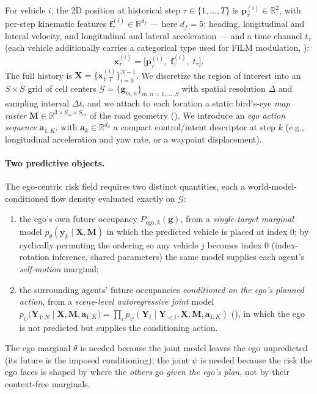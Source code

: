 \documentclass[journal]{IEEEtran}
\begin{document}
For vehicle $i$, the 2D position at historical step $\tau\in\{1,\dots,T\}$ is $\mathbf{p}^{(i)}_{\tau}\in\mathbb{R}^2$, with per-step kinematic features $\mathbf{f}^{(i)}_{\tau}\in\mathbb{R}^{d_f}$ --- here $d_f{=}5$: heading, longitudinal and lateral velocity, and longitudinal and lateral acceleration --- and a time channel $t_{\tau}$ (each vehicle additionally carries a categorical type used for FiLM modulation, ):
\begin{equation}
\mathbf{x}^{(i)}_{\tau}=\big[\mathbf{p}^{(i)}_{\tau},\;\mathbf{f}^{(i)}_{\tau},\;t_{\tau}\big].
\label{eq:input_def}
\end{equation}
The full history is $\mathbf{X}=\{\mathbf{x}^{(i)}_{1:T}\}_{i=0}^{N-1}$. We discretize the region of interest into an $S\times S$ grid of cell centers $\mathcal{G}=\{\mathbf{g}_{m,n}\}_{m,n=1,\dots,S}$ with spatial resolution $\Delta$ and sampling interval $\Delta t$, and we attach to each location a static bird's-eye \emph{map raster} $\mathbf{M}\in\mathbb{R}^{3\times S_m\times S_m}$ of the road geometry (). We introduce an \emph{ego action sequence} $\mathbf{a}_{1:K}$, with $\mathbf{a}_k\in\mathbb{R}^{d_a}$ a compact control/intent descriptor at step $k$ (e.g., longitudinal acceleration and yaw rate, or a waypoint displacement).

\paragraph{Two predictive objects.} The ego-centric risk field requires two distinct quantities, each a world-model-conditioned flow density evaluated exactly on $\mathcal{G}$:
\begin{enumerate}
\item the ego's own future occupancy $P_{\mathrm{ego},k}(\mathbf{g})$, from a \emph{single-target marginal} model $p_{\theta}(\mathbf{y}_k\mid\mathbf{X},\mathbf{M})$ in which the predicted vehicle is placed at index $0$; by cyclically permuting the ordering so any vehicle $j$ becomes index $0$ (index-rotation inference, shared parameters) the same model supplies each agent's \emph{self-motion} marginal;
\item the surrounding agents' future occupancies \emph{conditioned on the ego's planned action}, from a \emph{scene-level autoregressive joint} model $p_{\psi}\!\big(\mathbf{Y}_{1:N}\mid\mathbf{X},\mathbf{M},\mathbf{a}_{1:K}\big)=\prod_i p_{\psi}(\mathbf{Y}_i\mid\mathbf{Y}_{<i},\mathbf{X},\mathbf{M},\mathbf{a}_{1:K})$ (), in which the ego is not predicted but supplies the conditioning action.
\end{enumerate}
The ego marginal $\theta$ is needed because the joint model leaves the ego unpredicted (its future is the imposed conditioning); the joint $\psi$ is needed because the risk the ego faces is shaped by where the \emph{others} go \emph{given the ego's plan}, not by their context-free marginals.
\end{document}
